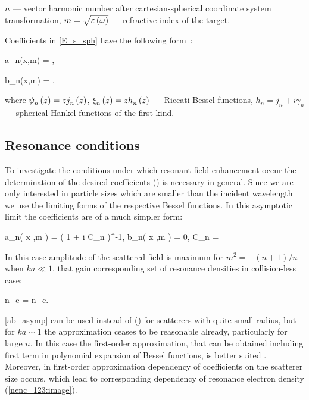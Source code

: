 \documentclass[conference]{IEEEtran}
\begin{document}
$n$ --- vector harmonic number after cartesian-spherical coordinate system transformation, $m = \sqrt{\varepsilon\left(\omega\right)}$ --- refractive index of the target.

Coefficients in \autoref{E_s_sph} have the following form~\cite{boren_huffman}:

    \eq
		a_n(x,\:m) = ,
		\label{an_bessel}
	\qe

    \eq
        b_n(x,\:m) = ,
        \label{bn_bessel}
    \qe
	\eqc %
    \cqe %

\noindent where ${\psi}_{n}^{} \left({z} \right) = z {j}_{n}^{} \left({z} \right)$, ${\xi}_{n}^{} \left({z} \right) = z {h}_{n}^{} \left({z} \right)$ --- Riccati-Bessel functions, $h_n = j_n + i \gamma_n$ --- spherical Hankel functions of the first kind.

\subsection{Resonance conditions}

To investigate the conditions under which resonant ﬁeld enhancement occur the determination of the desired coeﬃcients () is necessary in general. Since we are only interested in particle sizes which are smaller than the incident wavelength we use the limiting forms of the respective Bessel functions. In this asymptotic limit the coeﬃcients are of a much
simpler form:

	\eq
		a_n\left( x ,\:m \right) = \left( 1 + i C_n   \right)^{-1},
	\label{ab_asymp}
	\qe
	\eqc
		b_n\left( x ,\:m \right) = 0,
	\cqe
	\eqc
		C_n = 
	\cqe
	\eqc
	\cqe

In this case amplitude of the scattered field is maximum for $m^2 = - (n+ 1) / n$ when $ka \ll 1$, that gain corresponding set of resonance densities in collision-less case:

	\eqc
		n_e = n_c.
	\cqe

\autoref{ab_asymp} can be used instead of () for scatterers with quite small radius, but for $ka \sim 1$ the approximation ceases to be reasonable already, particularly for large $n$. In this case the first-order approximation, that can be obtained including first term in polynomial expansion of Bessel functions, is better suited \cite{abra_steg}. Moreover, in first-order approximation dependency of coefficients on the scatterer size occurs, which lead to corresponding dependency of resonance electron density (\autoref{nenc_123:image}).
\end{document}
